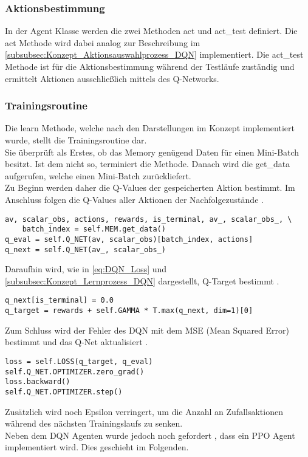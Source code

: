 \subsubsection{Aktionsbestimmung} \label{subsubsec:Implementierung_Aktionsbestimmung_DQN}
In der Agent Klasse werden die zwei Methoden act und act\_test definiert. Die act Methode wird dabei analog zur Beschreibung im \autoref{subsubsec:Konzept_Aktionsauswahlprozess_DQN} implementiert.
Die act\_test Methode ist für die Aktionsbestimmung während der Testläufe zuständig und ermittelt Aktionen ausschließlich mittels des Q-Networks.

\subsubsection{Trainingsroutine} \label{subsubsec:Implementierung_Trainingsroutine_DQN}
Die learn Methode, welche nach den Darstellungen im Konzept implementiert wurde, stellt die Trainingsroutine dar. \\
Sie überprüft als Erstes, ob das Memory genügend Daten für einen Mini-Batch besitzt. Ist dem nicht so, terminiert die Methode.
Danach wird die get\_data aufgerufen, welche einen Mini-Batch zurückliefert.\\
Zu Beginn werden daher die Q-Values der gespeicherten Aktion bestimmt. Im Anschluss folgen die Q-Values aller Aktionen der Nachfolgezustände .
\begin{lstlisting}[caption=Bestimmung der Q-Values, label=code:Bestimmung_Q-Values, style=Python]
av, scalar_obs, actions, rewards, is_terminal, av_, scalar_obs_, \
	batch_index = self.MEM.get_data()
q_eval = self.Q_NET(av, scalar_obs)[batch_index, actions]
q_next = self.Q_NET(av_, scalar_obs_)
\end{lstlisting}
Daraufhin wird, wie in \autoref{eq:DQN_Loss} und \autoref{subsubsec:Konzept_Lernprozess_DQN} dargestellt, Q-Target bestimmt .
\begin{lstlisting}[caption=Bestimmung von Q-Target, label=code:Bestimmung_Q-Target, style=Python]
q_next[is_terminal] = 0.0
q_target = rewards + self.GAMMA * T.max(q_next, dim=1)[0]
\end{lstlisting}
Zum Schluss wird der Fehler des DQN mit dem MSE (Mean Squared Error) bestimmt und das Q-Net aktualisiert .
\begin{lstlisting}[caption=Bestimmung des DQN Loss \& Update des Q-Networks, label=code:Bestimmung_DQN-Loss, style=Python]
loss = self.LOSS(q_target, q_eval)
self.Q_NET.OPTIMIZER.zero_grad()
loss.backward()
self.Q_NET.OPTIMIZER.step()
\end{lstlisting}
Zusätzlich wird noch Epsilon verringert, um die Anzahl an Zufallsaktionen während des nächsten Trainingslaufs zu senken.\\
Neben dem DQN Agenten wurde jedoch noch gefordert \fullref{subsec:Anforderungen_Diversität}, dass ein PPO Agent implementiert wird. Dies geschieht im Folgenden.

